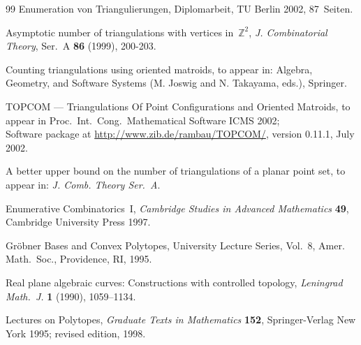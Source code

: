 \begin{thebibliography}{99}
{Enumeration von Triangulierungen,}
{Diplomarbeit, TU Berlin 2002, 87~Seiten.}

{Asymptotic number of triangulations with vertices in~${\mathbb Z}^2$,}
{{\sl J. Combinatorial Theory}, Ser.~A {\bf 86} (1999), 200-203.} 

{Counting triangulations using oriented matroids,}
{to appear in: Algebra, Geometry, and Software Systems (M. Joswig and
  N. Takayama, eds.), Springer.}

{TOPCOM --- Triangulations Of Point Configurations and Oriented Matroids,}
{to appear in 
Proc.\ Int.\ Cong.\ Mathematical Software ICMS 2002;\\
Software package at
\url{http://www.zib.de/rambau/TOPCOM/}, version 0.11.1, July 2002.}

{A better upper bound on the number of triangulations of a planar point set,}
{to appear in: {\sl J. Comb. Theory Ser.~A}.}

{Enumerative Combinatorics~I,}
{{\sl Cambridge Studies in Advanced Mathematics} {\bf 49},
 Cambridge University Press 1997.}

{Gr\"obner Bases and Convex Polytopes,}
{University Lecture Series, Vol.~8, Amer. Math.\ Soc.,
Providence, RI, 1995.}

{Real plane algebraic curves: Constructions with controlled topology,}
{{\sl Leningrad Math.\ J.} {\bf 1} (1990), 1059--1134.}

{Lectures on Polytopes,}
{{\sl Graduate Texts in Mathematics} {\bf 152}, 
Springer-Verlag New York 1995; revised edition, 1998.}

\end{thebibliography}



